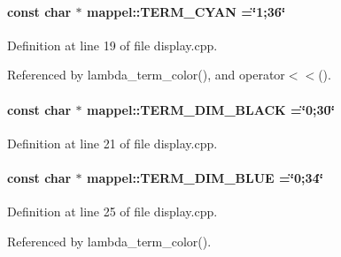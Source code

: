 \paragraph[{\texorpdfstring{T\+E\+R\+M\+\_\+\+C\+Y\+AN}{TERM_CYAN}}]{\setlength{\rightskip}{0pt plus 5cm}const char $\ast$ mappel\+::\+T\+E\+R\+M\+\_\+\+C\+Y\+AN =\char`\"{}1;36\char`\"{}}\hypertarget{namespacemappel_ad7696c53e61084d23f8532598b261c36}{}\label{namespacemappel_ad7696c53e61084d23f8532598b261c36}


Definition at line 19 of file display.\+cpp.



Referenced by lambda\+\_\+term\+\_\+color(), and operator$<$$<$().

\paragraph[{\texorpdfstring{T\+E\+R\+M\+\_\+\+D\+I\+M\+\_\+\+B\+L\+A\+CK}{TERM_DIM_BLACK}}]{\setlength{\rightskip}{0pt plus 5cm}const char $\ast$ mappel\+::\+T\+E\+R\+M\+\_\+\+D\+I\+M\+\_\+\+B\+L\+A\+CK =\char`\"{}0;30\char`\"{}}\hypertarget{namespacemappel_a233d1d0ed4c3957ba68364c5d9f6f45e}{}\label{namespacemappel_a233d1d0ed4c3957ba68364c5d9f6f45e}


Definition at line 21 of file display.\+cpp.

\paragraph[{\texorpdfstring{T\+E\+R\+M\+\_\+\+D\+I\+M\+\_\+\+B\+L\+UE}{TERM_DIM_BLUE}}]{\setlength{\rightskip}{0pt plus 5cm}const char $\ast$ mappel\+::\+T\+E\+R\+M\+\_\+\+D\+I\+M\+\_\+\+B\+L\+UE =\char`\"{}0;34\char`\"{}}\hypertarget{namespacemappel_a81976972f9e20d3f3ec3e541302bf465}{}\label{namespacemappel_a81976972f9e20d3f3ec3e541302bf465}


Definition at line 25 of file display.\+cpp.



Referenced by lambda\+\_\+term\+\_\+color().

